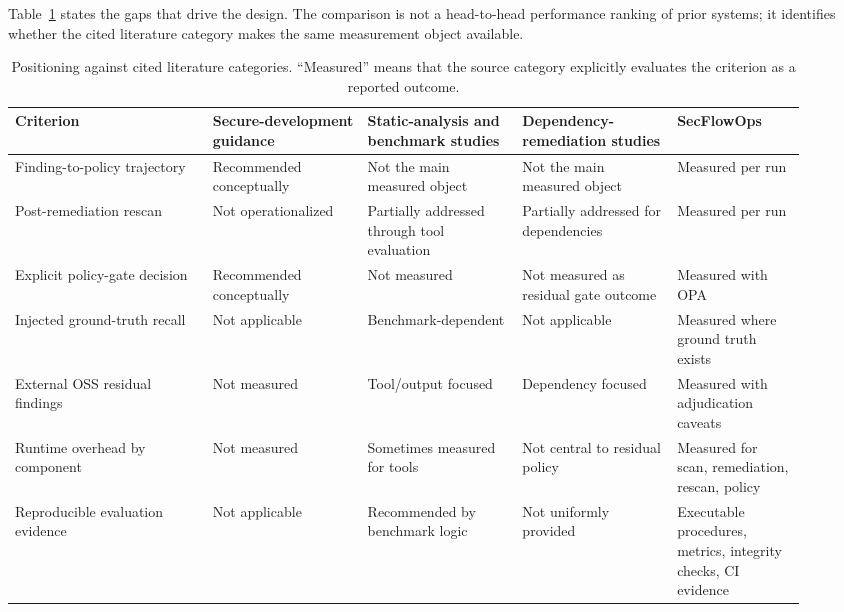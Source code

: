 Table~\ref{tab:gaps} states the gaps that drive the design. The comparison is not a head-to-head performance ranking of prior systems; it identifies whether the cited literature category makes the same measurement object available.

\begin{table}[t]
\centering
\footnotesize
\setlength{\tabcolsep}{3pt}
\caption{Positioning against cited literature categories. ``Measured'' means that the source category explicitly evaluates the criterion as a reported outcome.}
\label{tab:gaps}
\begin{tabular}{@{}p{0.23\linewidth}p{0.18\linewidth}p{0.18\linewidth}p{0.18\linewidth}p{0.15\linewidth}@{}}
\toprule
Criterion & Secure-development guidance \cite{nistSP800204D,nistSSDF,owaspSAMM} & Static-analysis and benchmark studies \cite{johnsonStaticAnalysis2013,bellerStaticAnalysis2016,pariziBenchmark2018} & Dependency-remediation studies \cite{decanNpm2018,mirhosseiniPullRequests2017} & SecFlowOps \\
\midrule
Finding-to-policy trajectory & Recommended conceptually & Not the main measured object & Not the main measured object & Measured per run \\
Post-remediation rescan & Not operationalized & Partially addressed through tool evaluation & Partially addressed for dependencies & Measured per run \\
Explicit policy-gate decision & Recommended conceptually & Not measured & Not measured as residual gate outcome & Measured with OPA \\
Injected ground-truth recall & Not applicable & Benchmark-dependent & Not applicable & Measured where ground truth exists \\
External OSS residual findings & Not measured & Tool/output focused & Dependency focused & Measured with adjudication caveats \\
Runtime overhead by component & Not measured & Sometimes measured for tools & Not central to residual policy & Measured for scan, remediation, rescan, policy \\
Reproducible evaluation evidence & Not applicable & Recommended by benchmark logic & Not uniformly provided & Executable procedures, metrics, integrity checks, CI evidence \\
\bottomrule
\end{tabular}
\end{table}

